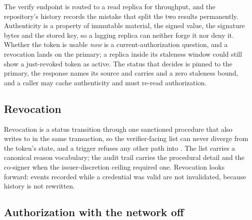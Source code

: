 The verify endpoint is routed to a read replica for throughput, and the repository's history
records the mistake that split the two results permanently. Authenticity is a property of immutable
material, the signed value, the signature bytes and the stored key, so a lagging replica can neither
forge it nor deny it. Whether the token is usable \emph{now} is a current-authorization question, and
a revocation lands on the primary; a replica inside its staleness window could still show a
just-revoked token as active. The status that decides  is pinned to
the primary, the response names its source and carries  and a zero staleness bound, and
a caller may cache authenticity and must re-read authorization. \sImpl

\subsection{Revocation}

Revocation is a status transition through one sanctioned procedure that also writes to
 in the same transaction, so the verifier-facing list can never diverge from
the token's state, and a trigger refuses any other path into . The list carries a
canonical reason vocabulary; the audit trail carries the procedural detail and the co-signer when
the issuer-discretion ceiling required one. Revocation looks forward: events recorded while a
credential was valid are not invalidated, because history is not rewritten. \sImpl

\subsection{Authorization with the network off}


